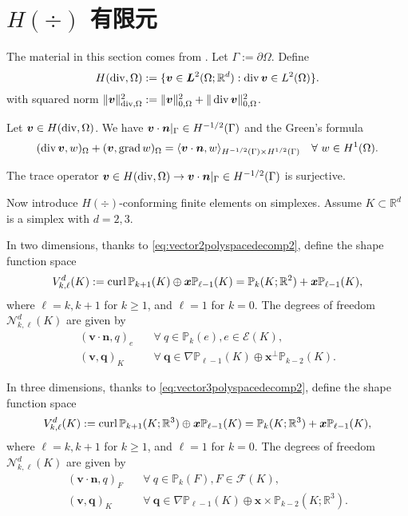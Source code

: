 \section{$H(\div)$ 有限元}
The material in this section comes from \cite{BoffiBrezziFortin2013}.
Let $\Gamma:=\partial\Omega$.
Define
\[
H(\operatorname{div},\Omega):=\{\boldsymbol v\in \boldsymbol L^2(\Omega;\mathbb R^d): \operatorname{div}\boldsymbol v\in L^2(\Omega)\}.
\]
with squared  norm $\|\boldsymbol v\|_{\operatorname{div}, \Omega}^2:=\|\boldsymbol v\|_{0, \Omega}^2+\|\operatorname{div}\boldsymbol v\|_{0, \Omega}^2$.
\begin{lemma}
Let $\boldsymbol v\in H(\operatorname{div},\Omega)$. We have $\boldsymbol v\cdot\boldsymbol n|_{\Gamma}\in H^{-1/2}(\Gamma)$ and the Green's formula
\[
(\operatorname{div}\boldsymbol v, w)_{\Omega} + (\boldsymbol v, \operatorname{grad} w)_{\Omega}=\langle\boldsymbol v\cdot\boldsymbol n, w\rangle_{H^{-1/2}(\Gamma)\times H^{1/2}(\Gamma)}\quad\forall~w\in H^1(\Omega).
\]
\end{lemma}

\begin{lemma}
The trace operator $\boldsymbol v\in H(\operatorname{div},\Omega)\to\boldsymbol v\cdot\boldsymbol n|_{\Gamma}\in H^{-1/2}(\Gamma)$ is surjective.
\end{lemma}

Now introduce $H(\div)$-conforming finite elements on simplexes.
Assume $K\subset \mathbb R^d$ is a simplex with $d=2,3$. 

In two dimensions,
thanks to \eqref{eq:vector2polyspacedecomp2}, define the shape function space
\[
V_{k,\ell}^d(K):=\operatorname{curl}\mathbb P_{k+1}(K)\oplus \boldsymbol x\mathbb P_{\ell-1}(K)=\mathbb P_{k}(K; \mathbb R^2) + \boldsymbol x\mathbb P_{\ell-1}(K),
\]
where $\ell=k, k+1$ for $k\geq1$, and $\ell=1$ for $k=0$. 
The degrees of freedom $\mathcal N_{k,\ell}^d(K)$ are given by
\begin{align}
(\boldsymbol v\cdot\boldsymbol  n, q)_e & \quad\forall~q\in\mathbb P_{k}(e),  e\in\mathcal E(K),\label{Hdivfem2ddof1}\\
(\boldsymbol v, \boldsymbol q)_K & \quad\forall~\boldsymbol q\in\nabla\mathbb P_{\ell-1}(K)\oplus\boldsymbol x^{\perp}\mathbb P_{k-2}(K). \label{Hdivfem2ddof2}
\end{align}


In three dimensions,
thanks to \eqref{eq:vector3polyspacedecomp2}, define the shape function space
\[
V_{k,\ell}^d(K):=\operatorname{curl}\mathbb P_{k+1}(K;\mathbb R^3)\oplus \boldsymbol x\mathbb P_{\ell-1}(K)=\mathbb P_{k}(K; \mathbb R^3) + \boldsymbol x\mathbb P_{\ell-1}(K),
\]
where $\ell=k, k+1$ for $k\geq1$, and $\ell=1$ for $k=0$. 
The degrees of freedom $\mathcal N_{k,\ell}^d(K)$ are given by
\begin{align}
(\boldsymbol v\cdot\boldsymbol  n, q)_F & \quad\forall~q\in\mathbb P_{k}(F),  F\in\mathcal F(K),\label{Hdivfem3ddof1}\\
(\boldsymbol v, \boldsymbol q)_K & \quad\forall~\boldsymbol q\in\nabla\mathbb P_{\ell-1}(K)\oplus\boldsymbol x\times\mathbb P_{k-2}(K; \mathbb R^3). \label{Hdivfem3ddof2}
\end{align}

